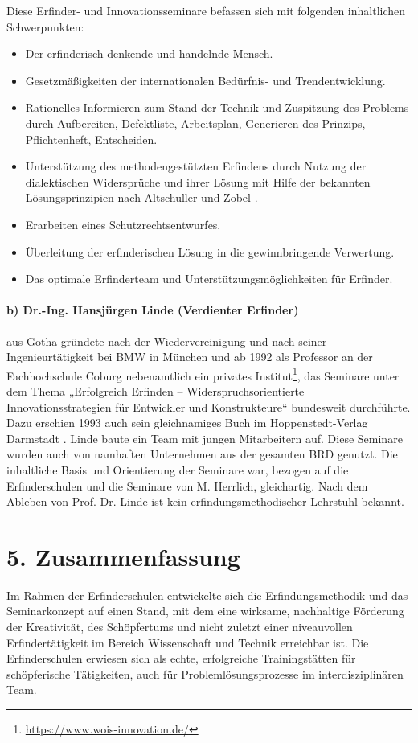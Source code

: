 \documentclass[11pt,a4paper]{article}
\begin{document}
Diese Erfinder- und Innovationsseminare befassen sich mit folgenden
inhaltlichen Schwerpunkten:
\begin{itemize}
\item Der erfinderisch denkende und handelnde Mensch.
\item Gesetzmäßigkeiten der internationalen Bedürfnis- und Trendentwicklung.
\item Rationelles Informieren zum Stand der Technik und Zuspitzung des
  Problems durch Aufbereiten, Defektliste, Arbeitsplan, Generieren des
  Prinzips, Pflichtenheft, Entscheiden.
\item Unterstützung des methodengestützten Erfindens durch Nutzung der
  dialektischen Widersprüche und ihrer Lösung mit Hilfe der bekannten
  Lösungsprinzipien nach Altschuller und Zobel \cite{3.1,9.1}.
\item Erarbeiten eines Schutzrechtsentwurfes.
\item Überleitung der erfinderischen Lösung in die gewinnbringende Verwertung.
\item Das optimale Erfinderteam und Unterstützungsmöglichkeiten für Erfinder.
\end{itemize}

\paragraph{b) Dr.-Ing. Hansjürgen Linde (Verdienter Erfinder)}
aus Gotha gründete nach der Wiedervereinigung und nach seiner
Ingenieurtätigkeit bei BMW in München und ab 1992 als Professor an der
Fachhochschule Coburg nebenamtlich ein privates
Institut\footnote{\url{https://www.wois-innovation.de/}}, das Seminare unter
dem Thema „Erfolgreich Erfinden -- Widerspruchsorientierte
Innovationsstrategien für Entwickler und Konstrukteure“ bundesweit
durchführte.  Dazu erschien 1993 auch sein gleichnamiges Buch im
Hoppenstedt-Verlag Darmstadt \cite{18}. Linde baute ein Team mit jungen
Mitarbeitern auf. Diese Seminare wurden auch von namhaften Unternehmen aus der
gesamten BRD genutzt.  Die inhaltliche Basis und Orientierung der Seminare
war, bezogen auf die Erfinderschulen und die Seminare von M. Herrlich,
gleichartig. Nach dem Ableben von Prof. Dr. Linde ist kein
erfindungsmethodischer Lehrstuhl bekannt.

\section*{5. Zusammenfassung}
Im Rahmen der Erfinderschulen entwickelte sich die Erfindungsmethodik und das
Seminarkonzept auf einen Stand, mit dem eine wirksame, nachhaltige Förderung
der Kreativität, des Schöpfertums und nicht zuletzt einer niveauvollen
Erfindertätigkeit im Bereich Wissenschaft und Technik erreichbar ist. Die
Erfinderschulen erwiesen sich als echte, erfolgreiche Trainingstätten für
schöpferische Tätigkeiten, auch für Problemlösungsprozesse im
interdisziplinären Team.
\end{document}
